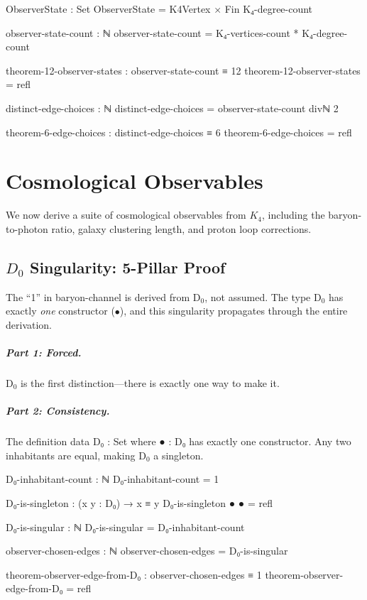 \documentclass[11pt,a4paper]{book}
\def\texttt#1{#1}%
\begin{document}
\begin{code}
ObserverState : Set
ObserverState = K4Vertex × Fin K₄-degree-count

observer-state-count : ℕ
observer-state-count = K₄-vertices-count * K₄-degree-count

theorem-12-observer-states : observer-state-count ≡ 12
theorem-12-observer-states = refl

distinct-edge-choices : ℕ
distinct-edge-choices = observer-state-count divℕ 2

theorem-6-edge-choices : distinct-edge-choices ≡ 6
theorem-6-edge-choices = refl
\end{code}

\chapter{Cosmological Observables}
\label{chap:cosmological-observables}

We now derive a suite of cosmological observables from $K_4$, including the baryon-to-photon ratio, galaxy clustering length, and proton loop corrections.

\section[D0 Singularity: 5-Pillar Proof]{$D_0$ Singularity: 5-Pillar Proof}

The ``1'' in baryon-channel is derived from D$_0$, not assumed. The type D$_0$ 
has exactly \emph{one} constructor ($\bullet$), and this singularity propagates 
through the entire derivation.

\paragraph{Part 1: Forced.}
D$_0$ is the first distinction---there is exactly one way to make it.

\paragraph{Part 2: Consistency.}
The definition \texttt{data D₀ : Set where ● : D₀} has exactly one constructor. 
Any two inhabitants are equal, making D$_0$ a singleton.

\begin{code}
D₀-inhabitant-count : ℕ
D₀-inhabitant-count = 1

D₀-is-singleton : (x y : D₀) → x ≡ y
D₀-is-singleton ● ● = refl

D₀-is-singular : ℕ
D₀-is-singular = D₀-inhabitant-count

observer-chosen-edges : ℕ
observer-chosen-edges = D₀-is-singular

theorem-observer-edge-from-D₀ : observer-chosen-edges ≡ 1
theorem-observer-edge-from-D₀ = refl
\end{code}
\end{document}
